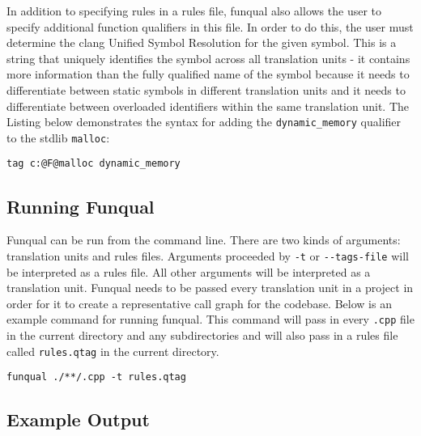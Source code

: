 In addition to specifying rules in a rules file, funqual also allows the user to specify additional function qualifiers in this file.  In order to do this, the user must determine the clang Unified Symbol Resolution for the given symbol.  This is a string that uniquely identifies the symbol across all translation units - it contains more information than the fully qualified name of the symbol because it needs to differentiate between static symbols in different translation units and it needs to differentiate between overloaded identifiers within the same translation unit.  The Listing below demonstrates the syntax for adding the \lstinline{dynamic_memory} qualifier to the stdlib \lstinline{malloc}:

\noindent\begin{minipage}[t]{\linewidth}
\begin{lstlisting}
tag c:@F@malloc dynamic_memory
\end{lstlisting}
\end{minipage}

\subsection{Running Funqual}\label{sec:operate:run}

Funqual can be run from the command line.  There are two kinds of arguments:  translation units and rules files.  Arguments proceeded by \lstinline{-t} or \lstinline{--tags-file} will be interpreted as a rules file.  All other arguments will be interpreted as a translation unit.  Funqual needs to be passed every translation unit in a project in order for it to create a representative call graph for the codebase.  Below is an example command for running funqual.  This command will pass in every \lstinline{.cpp} file in the current directory and any subdirectories and will also pass in a rules file called \lstinline{rules.qtag} in the current directory.

\noindent\begin{minipage}[t]{\linewidth}
\begin{lstlisting}
funqual ./**/.cpp -t rules.qtag
\end{lstlisting}
\end{minipage}

\subsection{Example Output}\label{sec:operate:output}

